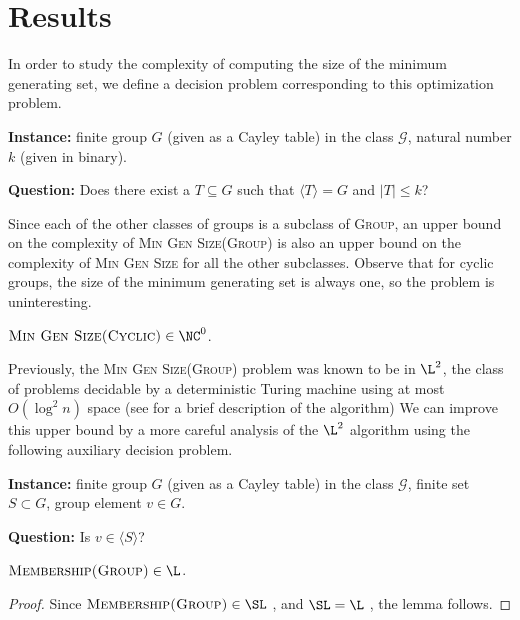 \documentclass{article}
\newcommand{\gen}[1]{{\langle #1 \rangle}}
\begin{document}
\section{Results}

In order to study the complexity of computing the size of the minimum generating set, we define a decision problem corresponding to this optimization problem.

\begin{definition}
  \mbox{}

  \textbf{Instance:} finite group $G$ (given as a Cayley table) in the class $\mathcal{G}$, natural number $k$ (given in binary).

  \textbf{Question:} Does there exist a $T \subseteq G$ such that $\gen{T} = G$ and $|T| \leq k$?
\end{definition}

Since each of the other classes of groups is a subclass of \textsc{Group}, an upper bound on the complexity of \textsc{Min Gen Size(Group)} is also an upper bound on the complexity of \textsc{Min Gen Size} for all the other subclasses.
Observe that for cyclic groups, the size of the minimum generating set is always one, so the problem is uninteresting.

\begin{theorem}
  $\textsc{Min Gen Size(Cyclic)} \in \NC^0$.
\end{theorem}

Previously, the \textsc{Min Gen Size(Group)} problem was known to be in $\L^2$, the class of problems decidable by a deterministic Turing machine using at most $O(\log^2 n)$ space \cite{lsz77} (see \cite[Proposition~3]{at06} for a brief description of the algorithm)
We can improve this upper bound by a more careful analysis of the $\L^2$ algorithm using the following auxiliary decision problem.

\begin{definition}
  \mbox{}

  \textbf{Instance:} finite group $G$ (given as a Cayley table) in the class $\mathcal{G}$, finite set $S \subset G$, group element $v \in G$.

  \textbf{Question:} Is $v \in \gen{S}$?
\end{definition}

\begin{lemma}\label{lem:membershipinl}
  $\textsc{Membership(Group)} \in \L$.
\end{lemma}
\begin{proof}
  Since $\textsc{Membership(Group)} \in \SL$ \cite[Section~3]{bm89}, and $\SL = \L$ \cite{reingold08}, the lemma follows.
\end{proof}
\end{document}
